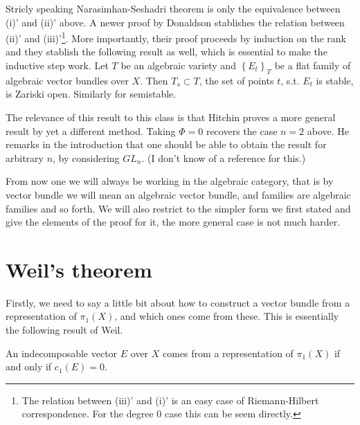 \begin{rem*}
Stricly speaking Narasimhan-Seshadri theorem is only the equivalence
between (i)' and (ii)' above. A newer proof by Donaldson
\cite{D} stablishes the relation between (ii)' and
(iii)'\footnote{The relation between (iii)' and (i)' is an easy case
  of Riemann-Hilbert correspondence. For the degree $0$ case this can
  be seem directly.}. More importantly, their proof proceeds by
induction on the rank and they stablish the following result as well,
which is essential to make the inductive step work. Let $T$ be an
algebraic variety and $\left\{ E_t\right\}_{T}$ be a flat family of
algebraic vector bundles over $X$. Then $T_s \subset T$, the set of
points $t$, s.t. $E_t$ is stable, is Zariski open. Similarly for
semistable.
\end{rem*} 

\begin{rem*}
The relevance of this result to this class is that Hitchin proves a
more general result \cite[Proposition 3.4]{H1} by yet a different
method. Taking $\Phi=0$ recovers the case $n=2$ above. He remarks in
the introduction that one should be able to obtain the result for
arbitrary $n$, by considering $GL_n$. (I don't know of a reference for
this.)
\end{rem*}

From now one we will always be working in the algebraic category, that
is by vector bundle we will mean an algebraic vector bundle, and
families are algebraic families and so forth. We will also restrict to
the simpler form we first stated and give the elements of the proof for
it, the more general case is not much harder.

\section{Weil's theorem}

Firstly, we need to say a little bit about how to construct a vector
bundle from a representation of $\pi_1(X)$, and which ones come from
these. This is essentially the following result of Weil.

\begin{prop} 
An indecomposable vector $E$ over $X$ comes from a representation of
$\pi_1(X)$ if and only if $c_1(E)=0$.
\end{prop}

